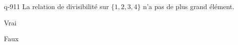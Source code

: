 \begin{truefalse}{q-911}
La relation de divisibilité sur $\{1,2,3,4\}$ n'a pas de plus grand élément.
\item* Vrai
\item Faux
\end{truefalse}

